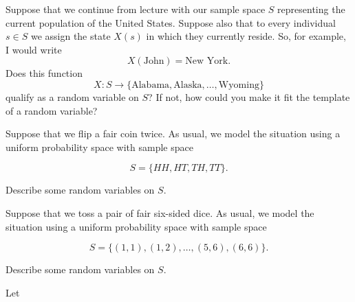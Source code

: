 \documentclass[12pt,reqno]{amsart}
\begin{document}
\bigskip

\prob Suppose that we continue from lecture with our sample space $S$ representing the current population of the United States. Suppose also that to every individual $s\in S$ we assign the state $X(s)$ in which they currently reside. So, for example, I would write
	\[
	X(\text{John}) = \text{New York}.
	\]
Does this function
	\[
	X: S \to \{\text{Alabama}, \text{Alaska},\ldots,\text{Wyoming}\}
	\]
qualify as a random variable on $S$? If not, how could you make it fit the template of a random variable?\vfill


















\bigskip
\prob Suppose that we flip a fair coin twice. As usual, we model the situation using a uniform probability space with sample space

	\[
	S = \{ HH, HT, TH, TT\}.
	\]

Describe some random variables on $S$.\vfill



















\bigskip

\prob Suppose that we toss a pair of fair six-sided dice. As usual, we model the situation using a uniform probability space with sample space

	\[
	S = \{(1,1),(1,2),\ldots,(5,6),(6,6)\}.
	\]

Describe some random variables on $S$.\vfill

























\newpage
\prob Let
\end{document}
